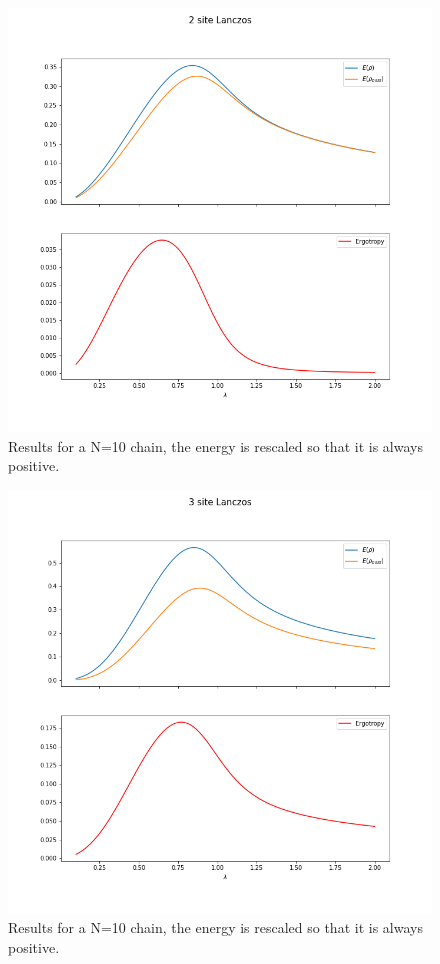 \documentclass[10pt,a4paper]{article}
\begin{document}
	\begin{figure}[b]
		\centering
		\includegraphics[width=\linewidth]{calcoli_lanczos_2}
		\caption{Results for a N=10 chain,	the energy is rescaled so that it is always positive.}
		\label{fig:calcolilanczos2}
	\end{figure}
	\begin{figure}[b]
		\centering
		\includegraphics[width=\linewidth]{calcoli_lanczos_3}
		\caption{Results for a N=10 chain,	the energy is rescaled so that it is always positive.}
		\label{fig:calcolilanczos3}
	\end{figure}
	
\end{document}
